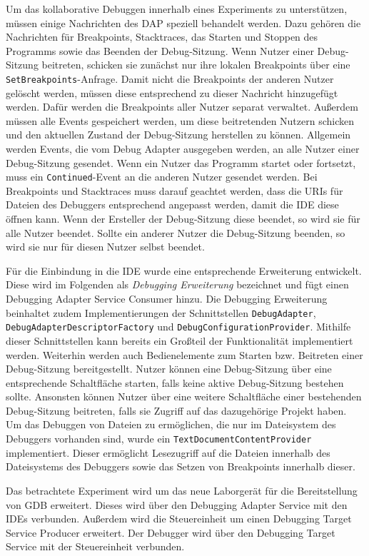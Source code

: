 Um das kollaborative Debuggen innerhalb eines Experiments zu unterstützen, müssen einige Nachrichten des \ac{DAP} speziell behandelt werden. Dazu gehören die Nachrichten für Breakpoints, Stacktraces, das Starten und Stoppen des Programms sowie das Beenden der Debug-Sitzung. Wenn Nutzer einer Debug-Sitzung beitreten, schicken sie zunächst nur ihre lokalen Breakpoints über eine \texttt{SetBreakpoints}-Anfrage. Damit nicht die Breakpoints der anderen Nutzer gelöscht werden, müssen diese entsprechend zu dieser Nachricht hinzugefügt werden. Dafür werden die Breakpoints aller Nutzer separat verwaltet. Außerdem müssen alle Events gespeichert werden, um diese beitretenden Nutzern schicken und den aktuellen Zustand der Debug-Sitzung herstellen zu können. Allgemein werden Events, die vom Debug Adapter ausgegeben werden, an alle Nutzer einer Debug-Sitzung gesendet. Wenn ein Nutzer das Programm startet oder fortsetzt, muss ein \texttt{Continued}-Event an die anderen Nutzer gesendet werden. Bei Breakpoints und Stacktraces muss darauf geachtet werden, dass die URIs für Dateien des Debuggers entsprechend angepasst werden, damit die IDE diese öffnen kann. Wenn der Ersteller der Debug-Sitzung diese beendet, so wird sie für alle Nutzer beendet. Sollte ein anderer Nutzer die Debug-Sitzung beenden, so wird sie nur für diesen Nutzer selbst beendet.

Für die Einbindung in die IDE wurde eine entsprechende Erweiterung entwickelt. Diese wird im Folgenden als \textit{Debugging Erweiterung} bezeichnet und fügt einen Debugging Adapter Service Consumer hinzu. Die Debugging Erweiterung beinhaltet zudem Implementierungen der Schnittstellen \texttt{DebugAdapter}, \texttt{DebugAdapterDescriptorFactory} und \texttt{DebugConfigurationProvider}. Mithilfe dieser Schnittstellen kann bereits ein Großteil der Funktionalität implementiert werden. Weiterhin werden auch Bedienelemente zum Starten bzw. Beitreten einer Debug-Sitzung bereitgestellt. Nutzer können eine Debug-Sitzung über eine entsprechende Schaltfläche starten, falls keine aktive Debug-Sitzung bestehen sollte. Ansonsten können Nutzer über eine weitere Schaltfläche einer bestehenden Debug-Sitzung beitreten, falls sie Zugriff auf das dazugehörige Projekt haben. Um das Debuggen von Dateien zu ermöglichen, die nur im Dateisystem des Debuggers vorhanden sind, wurde ein \texttt{TextDocumentContentProvider} implementiert. Dieser ermöglicht Lesezugriff auf die Dateien innerhalb des Dateisystems des Debuggers sowie das Setzen von Breakpoints innerhalb dieser.

Das betrachtete Experiment wird um das neue Laborgerät für die Bereitstellung von GDB erweitert. Dieses wird über den Debugging Adapter Service mit den IDEs verbunden. Außerdem wird die Steuereinheit um einen Debugging Target Service Producer erweitert. Der Debugger wird über den Debugging Target Service mit der Steuereinheit verbunden.